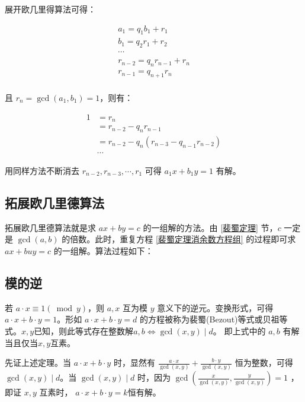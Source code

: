 \documentclass[a4paper]{article}         %
\begin{document}
展开欧几里得算法可得：

\begin{gather*}
    a_1 = q_1 b_1 + r_1 \\
    b_1 = q_2 r_1 + r_2 \\
    \cdots              \\
    r_{n-2} = q_{n} r_{n-1} + r_n\\
    r_{n-1} = q_{n+1} r_{n}\\
\end{gather*}

且 $r_n = \gcd(a_1, b_1) = 1$，则有：

\begin{equation}
    \label{裴蜀定理消余数方程组}
    \begin{aligned}
        1 & = r_n \\
        & = r_{n-2} - q_n r_{n-1} \\
        & = r_{n-2} - q_n (r_{n-3} - q_{n-1}r_{n-2}) \\
        & \cdots
    \end{aligned}
\end{equation}

用同样方法不断消去 $r_{n-2}, r_{n-3}, \cdots, r_1$ 可得 $a_1 x + b_1 y = 1$ 有解。

\subsection{拓展欧几里德算法}


拓展欧几里德算法就是求 $ax + by = c$ 的一组解的方法。由 \ref{裴蜀定理} 节，$c$ 一定是 $\gcd(a, b)$ 的倍数。此时，重复方程 \ref{裴蜀定理消余数方程组} 的过程即可求 $ax + buy = c$ 的一组解。算法过程如下：



\subsection{模的逆}

若 $a \cdot x \equiv 1 (\bmod y)$，则 $a, x$ 互为模 $y$ 意义下的逆元。变换形式，可得$a \cdot x + b \cdot y = 1$。形如 $a \cdot x + b \cdot y = d$ 的方程被称为裴蜀(Bezout)等式或贝祖等式。$x, y$已知，则此等式存在整数解$a, b \iff \gcd(x, y) \mid d$。 即上式中的 $a,b$ 有解当且仅当$x, y$互素。

先证上述定理。当 $a \cdot x + b \cdot y$ 时，显然有 $\frac{a \cdot x}{\gcd(x, y)} + \frac{b \cdot y}{\gcd(x, y)}$ 恒为整数，可得 $\gcd(x, y) \mid d$。当 $\gcd(x, y) \mid d$ 时，因为 $\gcd(\frac{x}{\gcd(x, y)},\frac{y}{\gcd(x, y)}) = 1$ ，即证 $x, y$ 互素时， $a \cdot x + b \cdot y = k$恒有解。
\end{document}
